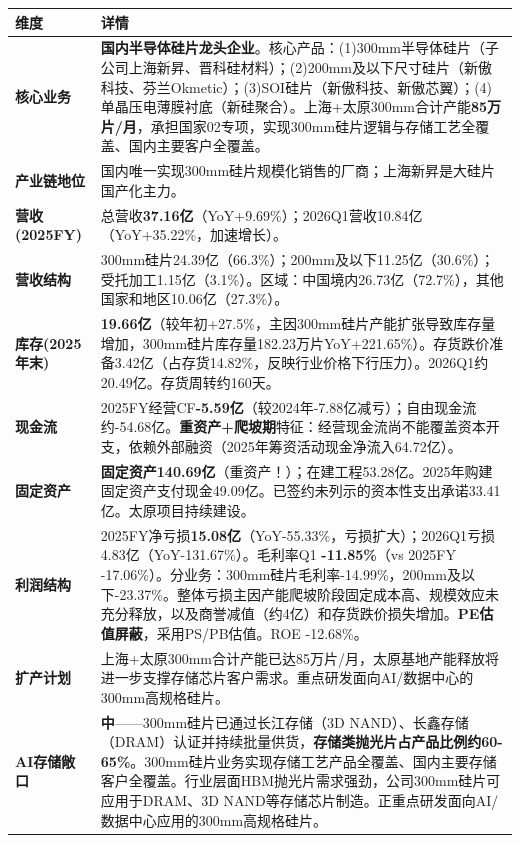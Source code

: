 \begin{exhibitbox}
\centering
\scriptsize
\renewcommand{\arraystretch}{1.20}
\begin{tabularx}{\exhibitboxwidth}{>{\bfseries}p{2.2cm} >{\raggedright\arraybackslash\sloppy\hspace{0pt}}X}
\toprule
\textbf{维度} & \textbf{详情} \\
\midrule
核心业务 & \textbf{国内半导体硅片龙头企业}。核心产品：(1)300mm半导体硅片（子公司上海新昇、晋科硅材料）；(2)200mm及以下尺寸硅片（新傲科技、芬兰Okmetic）；(3)SOI硅片（新傲科技、新傲芯翼）；(4)单晶压电薄膜衬底（新硅聚合）。上海+太原300mm合计产能\textbf{85万片/月}，承担国家02专项，实现300mm硅片逻辑与存储工艺全覆盖、国内主要客户全覆盖。 \\
产业链地位 & 国内唯一实现300mm硅片规模化销售的厂商；上海新昇是大硅片国产化主力。 \\
营收(2025FY) & 总营收\textbf{37.16亿}（YoY+9.69\%）；2026Q1营收10.84亿（YoY+35.22\%，加速增长）。 \\
营收结构 & 300mm硅片24.39亿（66.3\%）；200mm及以下11.25亿（30.6\%）；受托加工1.15亿（3.1\%）。区域：中国境内26.73亿（72.7\%），其他国家和地区10.06亿（27.3\%）。 \\
库存(2025年末) & \textbf{19.66亿}（较年初+27.5\%，主因300mm硅片产能扩张导致库存量增加，300mm硅片库存量182.23万片YoY+221.65\%）。存货跌价准备3.42亿（占存货14.82\%，反映行业价格下行压力）。2026Q1约20.49亿。存货周转约160天。 \\
现金流 & 2025FY经营CF\textbf{-5.59亿}（较2024年-7.88亿减亏）；自由现金流约-54.68亿。\textbf{重资产+爬坡期}特征：经营现金流尚不能覆盖资本开支，依赖外部融资（2025年筹资活动现金净流入64.72亿）。 \\
固定资产 & \textbf{固定资产140.69亿}（重资产！）；在建工程53.28亿。2025年购建固定资产支付现金49.09亿。已签约未列示的资本性支出承诺33.41亿。太原项目持续建设。 \\
利润结构 & 2025FY净亏损\textbf{15.08亿}（YoY-55.33\%，亏损扩大）；2026Q1亏损4.83亿（YoY-131.67\%）。毛利率Q1 \textbf{-11.85\%}（vs 2025FY -17.06\%）。分业务：300mm硅片毛利率-14.99\%，200mm及以下-23.37\%。整体亏损主因产能爬坡阶段固定成本高、规模效应未充分释放，以及商誉减值（约4亿）和存货跌价损失增加。\textbf{PE估值屏蔽}，采用PS/PB估值。ROE -12.68\%。 \\
\midrule
\rowcolor{riskamber!8}
\textbf{扩产计划} & 上海+太原300mm合计产能已达85万片/月，太原基地产能释放将进一步支撑存储芯片客户需求。重点研发面向AI/数据中心的300mm高规格硅片。 \\
\midrule
AI存储敞口 & \textbf{中}——300mm硅片已通过长江存储（3D NAND）、长鑫存储（DRAM）认证并持续批量供货，\textbf{存储类抛光片占产品比例约60-65\%}。300mm硅片业务实现存储工艺产品全覆盖、国内主要存储客户全覆盖。行业层面HBM抛光片需求强劲，公司300mm硅片可应用于DRAM、3D NAND等存储芯片制造。正重点研发面向AI/数据中心应用的300mm高规格硅片。 \\
\bottomrule
\end{tabularx}
\end{exhibitbox}

